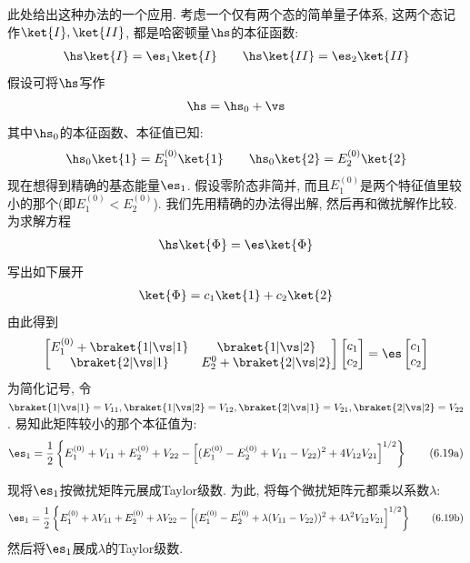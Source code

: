 此处给出这种办法的一个应用. 
考虑一个仅有两个态的简单量子体系, 
这两个态记作$\ket{I},\ket{II}$, 都是哈密顿量$\hs$的本征函数:
\begin{align*}
\hs\ket{I} = \es_1\ket{I} \qquad \hs\ket{II} = \es_2\ket{II}
\end{align*}
假设可将$\hs$写作
\begin{align*}
\hs=\hs_0+\vs
\end{align*}
其中$\hs_0$的本征函数、本征值已知:
\begin{align*}
\hs_0\ket{1} = E_1^{(0)}\ket{1}\qquad \hs_0\ket{2} = E_2^{(0)}\ket{2}
\end{align*}
现在想得到精确的基态能量$\es_1$. 
假设零阶态非简并, 
而且$E_1^{(0)}$是两个特征值里较小的那个(即$E_1^{(0)} < E_2^{(0)}$). 
我们先用精确的办法得出解, 
然后再和微扰解作比较. 
为求解方程
\begin{align}
\hs\ket{\Phi}=\es\ket{\Phi}
\end{align}
写出如下展开
\begin{align}
\ket{\Phi} = c_1\ket{1} + c_2\ket{2}
\end{align}
由此得到
\begin{align}
\begin{bmatrix}
E_1^{(0)} + \braket{1|\vs|1} & \braket{1|\vs|2}\\
\braket{2|\vs|1}			& E_2^{0} + \braket{2|\vs|2}
\end{bmatrix}
\begin{bmatrix}
c_1\\c_2
\end{bmatrix}
=
\es\begin{bmatrix}
c_1\\c_2
\end{bmatrix}
\end{align}
为简化记号, 
令$\braket{1|\vs|1}=V_{11},\braket{1|\vs|2}=V_{12},\braket{2|\vs|1}=V_{21},\braket{2|\vs|2}=V_{22}$. 
易知此矩阵较小的那个本征值为:
\begin{align}
\es_1 = \frac{1}{2} \left\{  E_1^{(0)} + V_{11} + E_2^{(0)} + V_{22} - \left[ (E_1^{(0)} -E_{2}^{(0)} + V_{11} - V_{22})^2 +4V_{12}V_{21} \right]^{1/2}      \right\}\tag{6.19a}
\addtocounter{equation}{1}
\end{align}

现将$\es_1$按微扰矩阵元展成Taylor级数. 
 为此, 
将每个微扰矩阵元都乘以系数$\lambda$:
\begin{align}
\es_1 = \frac{1}{2} \left\{  E_1^{(0)} + \lambda V_{11} + E_2^{(0)} + \lambda V_{22} - \left[ (E_1^{(0)} -E_{2}^{(0)} + \lambda(V_{11} - V_{22}))^2 +4\lambda^2 V_{12}V_{21} \right]^{1/2}      \right\}\tag{6.19b}
\end{align}
然后将$\es_1$展成$\lambda$的Taylor级数.



